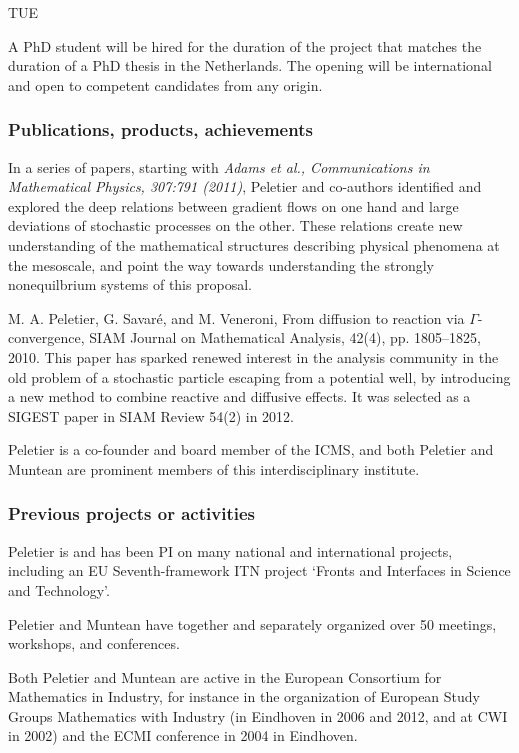 \begin{sitedescription}{TUE}
\begin{participant}[type=res,PM=48]
A PhD student will be hired for the duration of the project that matches the duration of a
PhD thesis in the Netherlands. 
%
The opening will be international and open to competent candidates from any
origin.
\end{participant}


\subsubsection*{Publications, products, achievements}

\begin{compactenum}
\item {In a series of papers, starting with \emph{Adams et al., Communications in Mathematical Physics, 307:791 (2011)}, Peletier and co-authors identified and explored the deep relations between gradient flows on one hand and large deviations of stochastic processes on the other. These relations create new understanding of the mathematical structures describing physical phenomena at the mesoscale, and point the way towards understanding the strongly nonequilbrium systems of this proposal.}
\item {M. A. Peletier, G. Savar\'e, and M. Veneroni, From diffusion to reaction via $\Gamma$-convergence, SIAM Journal on Mathematical Analysis, 42(4), pp. 1805--1825, 2010.
This paper has sparked renewed interest in the analysis community in the old problem of a stochastic particle escaping from a potential well, by introducing a new method to combine reactive and diffusive effects. It was selected as a SIGEST paper in SIAM Review 54(2) in 2012.}
\item {Peletier is a co-founder and board member of the ICMS, and both Peletier and Muntean are prominent members of this interdisciplinary institute.}
\end{compactenum}

\subsubsection*{Previous projects or activities}

\begin{compactenum}
\item {Peletier is and has been PI on many national and international projects, including an EU Seventh-framework ITN project `Fronts and Interfaces in Science and Technology'.}
\item {Peletier and Muntean have together and separately organized over 50 meetings, workshops, and conferences.}
\item Both Peletier and Muntean are active in the European Consortium for Mathematics in Industry, for instance in the organization of European Study Groups Mathematics with Industry (in Eindhoven in 2006 and 2012, and at CWI in 2002) and the ECMI conference in 2004 in Eindhoven.
\end{compactenum}


\end{sitedescription}
